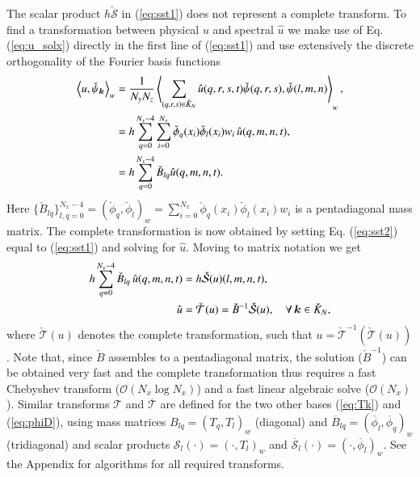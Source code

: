 \documentclass[11pt, oneside]{elsarticle}
\newcommand{\N}[1]{\check{#1}}
\newcommand{\D}[1]{\overline{#1}}
\begin{document}
The scalar product  $h\N{\mathcal{S}}$ in (\ref{eq:sst1}) does not represent a 
complete transform. To find a transformation between physical $u$ and spectral 
$\hat{u}$ we make use of Eq. (\ref{eq:u_solx}) directly in the first line of (\ref{eq:sst1}) and use extensively the discrete 
orthogonality of the Fourier basis functions
\begin{align}
\left<u, \N{\psi}_{\bm{k}}\right>_w &= \frac{1}{N_yN_z}\left< 
\sum_{(q,r,s) \in \N{K}_N} \hat{u}(q,r,s,t) \N{\psi}(q,r,s), 
\N{\psi}(l,m,n) \right>_w, \notag \\
           &= h \sum_{q=0}^{N_x-4} \sum_{i=0}^{N_x} \N{\phi}_{q}(x_i) 
           \N{\phi}_{l}(x_i) w_i \, \hat{u}(q, {m}, {n}, t), \notag \\
           &= h \sum_{q=0}^{N_x-4} \N{B}_{lq} \hat{u}(q, {m}, {n}, t). 
           \label{eq:sst2}
\end{align}
Here $\{\N{B}_{lq}\}_{l,q=0}^{N_x-4} = (\N{\phi}_q, \N{\phi}_l)_w = 
\sum_{i=0}^{N_x} \N{\phi}_{q}(x_i) \N{\phi}_{l}(x_i) w_i$ is a 
pentadiagonal mass matrix. The complete transformation is now obtained by 
setting Eq. (\ref{eq:sst2}) equal to (\ref{eq:sst1}) and solving for $\hat{u}$. 
Moving to matrix notation we get
\begin{align}
h\sum_{q=0}^{N_x-4} \N{B}_{lq}\, \hat{u}(q, {m}, {n}, t) &= 
h\N{\mathcal{S}}(u)(l, m, n, t), \notag \\
 \hat{u} &= \N{\mathcal{T}}(u) =  \N{B}^{-1}\N{\mathcal{S}}(u), 
 \quad \forall \, \bm{k} \in \N{K}_N, \label{eq:fstB}
\end{align}
where $\N{\mathcal{T}}(u)$ denotes the complete transformation, such that $u = 
\N{\mathcal{T}}^{-1}(\N{\mathcal{T}}(u))$. Note that, since $\N{B}$ assembles to 
a pentadiagonal matrix, the solution ($\N{B}^{-1}$) can be obtained very fast and the complete 
transformation thus requires a fast Chebyshev transform ($\mathcal{O}(N_x \log N_x)$) and 
a fast linear algebraic solve ($\mathcal{O}(N_x)$). Similar transforms $\mathcal{T}$ 
and $\D{\mathcal{T}}$ are defined for the two other bases (\ref{eq:Tk}) and 
(\ref{eq:phiD}), using mass matrices $B_{lq}=(T_q, T_l)_w$ (diagonal) and 
$\D{B}_{lq}=(\D{\phi}_l, \D{\phi}_q)_w$ (tridiagonal) and scalar products 
$\mathcal{S}_l(\cdot) = (\cdot, T_l)_w$ and $\D{\mathcal{S}}_l(\cdot) = (\cdot, 
\D{\phi}_l)_w$. See the Appendix for algorithms for all required transforms.
\end{document}
